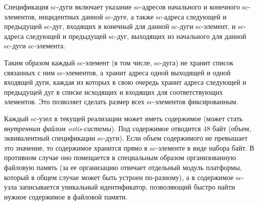 \begin{SCn}
{Спецификация sc-дуги включает указание sc-адресов начального и конечного sc-элементов, инцидентных данной sc-дуге, а также sc-адреса следующей и предыдущей sc-дуг, входящих в конечный для данной sc-дуги sc-элемент, и sc-адреса следующей и предыдущей sc-дуг, выходящих из начального для данной sc-дуги sc-элемента. 

Таким образом каждый sc-элемент (в том числе, sc-дуга) не хранит список связанных с ним sc-элементов, а хранит адреса одной выходящей и одной входящей дуги, каждая из которых в свою очередь хранит адреса следующей и предыдущей дуг в списке исходящих и входящих для соответствующих элементов. Это позволяет сделать размер всех sc-элементов фиксированным.
	
Каждый sc-узел в текущей реализации может иметь содержимое (может стать \textit{внутренним файлом ostis-системы}). Под содержимое отводится 48 байт (объем, эквивалентный спецификации sc-дуги). Если объем содержимого не превышает это значение, то содержимое хранится прямо в sc-элементе в виде набора байт. В противном случае оно помещается в специальным образом организованную файловую память (за ее организацию отвечает отдельный модуль платформы, который в общем случае может быть устроен по-разному), а в содержимое sc-узла записывается уникальный идентификатор, позволяющий быстро найти нужное содержимое в файловой памяти.
}


\end{SCn}
